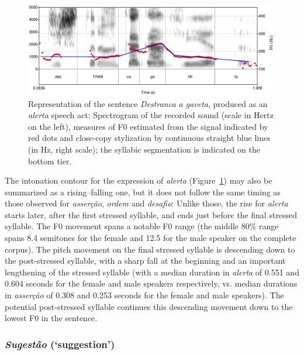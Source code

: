 \documentclass[output=paper]{LSP/langsci}
\begin{document}
\begin{figure}

\includegraphics[width=0.99\textwidth]{figures/MOR7.eps}
\caption{Representation of the sentence \textit{Destranca a gaveta}, produced as an \textit{alerta} speech act: Spectrogram of the recorded sound (scale in Hertz on the left), measures of F0 estimated from the signal indicated by red dots and close-copy stylization by continuous straight blue lines (in Hz, right scale); the syllabic segmentation is indicated on the bottom tier.}
\label{figure:CC5}
\end{figure}

The intonation contour for the expression of \textit{alerta} (Figure~\ref{figure:CC5}) may also be summarized as a rising–falling one, but it does not follow the same timing as those observed for \textit{asserção}, \textit{ordem} and \textit{desafio}: Unlike those, the rise for \textit{alerta} starts later, after the first stressed syllable, and ends just before the final stressed syllable. 
The F0 movement spans a notable F0 range (the middle 80\% range spans 8.4 semitones for the female and 12.5 for the male speaker on the complete corpus). 
The pitch movement on the final stressed syllable is descending down to the post-stressed syllable, with a sharp fall at the beginning and an important lengthening of the stressed syllable (with a median duration in \textit{alerta} of 0.551 and 0.604 seconds for the female and male speakers respectively, vs. median durations in \textit{asserção} of 0.308 and 0.253 seconds for the female and male speakers). 
The potential post-stressed syllable continues this descending movement down to the lowest F0 in the sentence.


\subsubsection{\textit{Sugestão} (`suggestion')}
\end{document}
